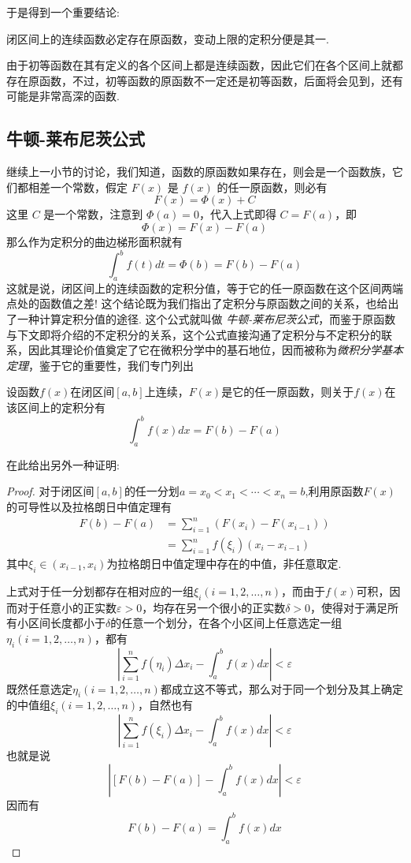 于是得到一个重要结论:
\begin{inference}
  闭区间上的连续函数必定存在原函数，变动上限的定积分便是其一.
\end{inference}

由于初等函数在其有定义的各个区间上都是连续函数，因此它们在各个区间上就都存在原函数，不过，初等函数的原函数不一定还是初等函数，后面将会见到，还有可能是非常高深的函数.


\subsection{牛顿-莱布尼茨公式}
\label{sec:newton-leibniz-formular}

继续上一小节的讨论，我们知道，函数的原函数如果存在，则会是一个函数族，它们都相差一个常数，假定 $F(x)$ 是 $f(x)$ 的任一原函数，则必有
\[ F(x) = \Phi(x) +C \]
这里 $C$ 是一个常数，注意到 $\Phi(a)=0$，代入上式即得 $C=F(a)$，即
\[ \Phi(x) = F(x) - F(a) \]
那么作为定积分的曲边梯形面积就有
\[ \int_a^{b}f(t)dt = \Phi(b) = F(b) - F(a) \]
这就是说，闭区间上的连续函数的定积分值，等于它的任一原函数在这个区间两端点处的函数值之差! 这个结论既为我们指出了定积分与原函数之间的关系，也给出了一种计算定积分值的途径. 这个公式就叫做 \emph{牛顿-莱布尼茨公式}，而鉴于原函数与下文即将介绍的不定积分的关系，这个公式直接沟通了定积分与不定积分的联系，因此其理论价值奠定了它在微积分学中的基石地位，因而被称为\emph{微积分学基本定理}，鉴于它的重要性，我们专门列出
\begin{theorem}
  设函数$f(x)$在闭区间$[a,b]$上连续，$F(x)$是它的任一原函数，则关于$f(x)$在该区间上的定积分有
  \[ \int_a^{b} f(x)dx=F(b)-F(a) \]
\end{theorem}
在此给出另外一种证明:
\begin{proof}
  对于闭区间$[a,b]$的任一分划$a=x_0<x_1<\cdots<x_n=b$,利用原函数$F(x)$的可导性以及拉格朗日中值定理有
  \begin{equation*}
    \begin{split}
      F(b)-F(a) & = \sum_{i=1}^n (F(x_i)-F(x_{i-1})) \\
      & = \sum_{i=1}^n f(\xi_i)(x_i-x_{i-1})
    \end{split}
  \end{equation*}
  其中$\xi_{i} \in (x_{i-1}, x_i)$为拉格朗日中值定理中存在的中值，非任意取定.

  上式对于任一分划都存在相对应的一组$\xi_i(i=1,2,\ldots,n)$，而由于$f(x)$可积，因而对于任意小的正实数$\varepsilon>0$，均存在另一个很小的正实数$\delta>0$，使得对于满足所有小区间长度都小于$\delta$的任意一个划分，在各个小区间上任意选定一组$\eta_i(i=1,2,\ldots,n)$，都有
  \[ \left|\sum_{i=1}^nf(\eta_i)\Delta x_i-\int_a^{b}f(x)dx \right| <\varepsilon \]
既然任意选定$\eta_i(i=1,2,\ldots,n)$都成立这不等式，那么对于同一个划分及其上确定的中值组$\xi_i(i=1,2,\ldots,n)$，自然也有
  \[ \left|\sum_{i=1}^nf(\xi_i)\Delta x_i-\int_a^{b}f(x)dx \right| <\varepsilon \]
  也就是说
  \[ \left| [F(b)-F(a)]-\int_a^{b}f(x)dx \right| <\varepsilon \]
  因而有
  \[ F(b)-F(a) = \int_a^{b} f(x)dx \]
\end{proof}

